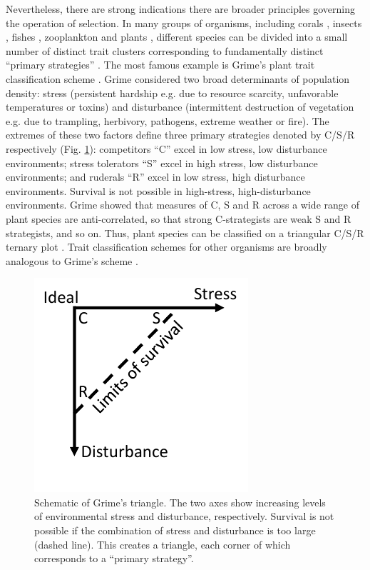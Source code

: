 \documentclass[11pt]{article}
\begin{document}
Nevertheless, there are strong indications there are broader principles governing the operation of selection. In many groups of organisms, including corals \citep{darling_2012}, insects \citep{southwood_1977}, fishes \citep{winemiller_1992}, zooplankton \citep{allan_76} and plants \citep{grime_1988,westoby_1998}, different species can be divided into a small number of distinct trait clusters corresponding to fundamentally distinct ``primary strategies'' \citep{winemiller_2015}. The most famous example is Grime's plant trait classification scheme \citep{grime_1974,grime_1977,grime_1988}. Grime considered two broad determinants of population density: stress (persistent hardship e.g. due to resource scarcity, unfavorable temperatures or toxins) and disturbance (intermittent destruction of vegetation e.g. due to trampling, herbivory, pathogens, extreme weather or fire).  The extremes of these two factors define three primary strategies denoted by C/S/R respectively (Fig. \ref{fig:grimeschematic}): competitors ``C'' excel in low stress, low disturbance environments; stress tolerators ``S'' excel in high stress, low disturbance environments; and ruderals ``R''  excel in low stress, high disturbance environments. Survival is not possible in high-stress, high-disturbance environments. Grime showed that measures of C, S and R across a wide range of plant species are anti-correlated, so that strong C-strategists are weak S and R strategists, and so on. Thus, plant species can be classified on a triangular C/S/R ternary plot \citep{grime_1974}. Trait classification schemes for other organisms are broadly analogous to Grime's scheme \citep{winemiller_2015}. 

\begin{figure}
\centering
\includegraphics[scale=1]{grimeschematic.pdf}
\caption{\label{fig:grimeschematic} Schematic of Grime's triangle. The two axes show increasing levels of environmental stress and disturbance, respectively. Survival is not possible if the combination of stress and disturbance is too large (dashed line). This creates a triangle, each corner of which corresponds to a ``primary strategy''.} 
\end{figure}
\end{document}
